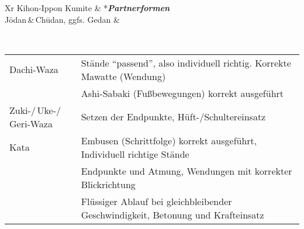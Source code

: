 \begin{tcolorbox}[width=\textwidth,height=\textheight,right=12pt,left=12pt,colframe=OBELT,colback=white,fonttitle=\bfseries,coltitle=white,title=7. Kyu:\indent Kihon-Ido Kata - Partnerformen - Erwartungshorizont]
\begin{minipage}[t]{0.45\textwidth}
		\begin{tabularx}{\textwidth}{Xr}
			\midrule
			Kihon-Ippon Kumite 						& *{\textit{\textbf{Partnerformen}}} \\
			J\={o}dan\,\&\,Ch\={u}dan, ggfs. Gedan	& \\
			\midrule
		\end{tabularx}
	\end{minipage}\\
	\null\vfill\null
	{\small
	\begin{tabularx}{\textwidth}{ll}
		\midrule
		Dachi-Waza					& Stände \textquotedblleft passend\textquotedblright , also individuell richtig. Korrekte Mawatte (Wendung) \\
		& Ashi-Sabaki (Fußbewegungen) korrekt ausgeführt \\
		Zuki-/\,Uke-/\,Geri-Waza	& Setzen der Endpunkte, Hüft-/Schultereinsatz \\
		Kata						& Embusen (Schrittfolge) korrekt ausgeführt, Individuell richtige Stände \\
		& Endpunkte und Atmung, Wendungen mit korrekter Blickrichtung \\
		& Flüssiger Ablauf bei gleichbleibender Geschwindigkeit, Betonung und Krafteinsatz \\
		\midrule
	\end{tabularx}}\null\vfill\null
\end{tcolorbox}